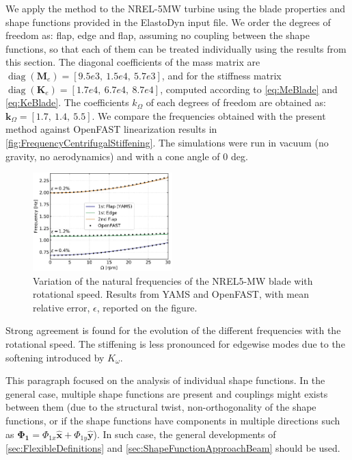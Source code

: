 \documentclass[wes, manuscript]{copernicus}
\renewcommand{\v}[1]{\boldsymbol{#1}}
\newcommand{\m}[1]{\boldsymbol{#1}}
\begin{document}
We apply the method to the NREL-5MW turbine using the blade properties and shape functions provided in the ElastoDyn input file. 
We order the degrees of freedom as:  flap,  edge and  flap, assuming no coupling between the shape functions, so that each of them can be treated individually using the results from this section. The diagonal coefficients of the mass matrix are $\operatorname{diag}(\m{M}_e) = [9.5e3,\ 1.5e4,\ 5.7e3]$, and for the stiffness matrix
$\operatorname{diag}(\m{K}_e)=[1.7e4,\ 6.7e4,\ 8.7e4]$, computed according to \autoref{eq:MeBlade} and \autoref{eq:KeBlade}. 
The coefficients $k_\Omega$ of each degrees of freedom are obtained as: $\v{k}_\Omega =[1.7,\ 1.4,\ 5.5]$. We compare the frequencies obtained with the present method against OpenFAST linearization results in \autoref{fig:FrequencyCentrifugalStiffening}. The simulations were run in vacuum (no gravity, no aerodynamics) and with a cone angle of 0 deg.
\noindent\begin{figure}[!htb]\centering%
  \includegraphics[width=0.48\textwidth]{figs/FrequencyCentrifugalStiffening.pdf}
  \caption{Variation of the natural frequencies of the NREL5-MW blade with rotational speed. Results from YAMS and OpenFAST, with mean relative error, $\epsilon$, reported on the figure.}\label{fig:FrequencyCentrifugalStiffening}%
\end{figure}
Strong agreement is found for the evolution of the different frequencies with the rotational speed. The stiffening is less pronounced for edgewise modes due to the softening introduced by $K_\omega$.

This paragraph focused on the analysis of individual shape functions. In the general case, multiple shape functions are present and couplings might exists between them (due to the structural twist, non-orthogonality of the shape functions, or if the shape functions have components in multiple directions such as $\v{\Phi_1}=\Phi_{1x}\v{\hat{x}}+\Phi_{1y}\v{\hat{y}}$). In such case, the general developments of 
\autoref{sec:FlexibleDefinitions} and 
\autoref{sec:ShapeFunctionApproachBeam} should be used.
\end{document}
